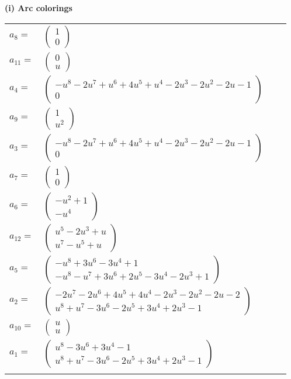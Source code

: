 \documentclass[1p]{elsarticle_modified}
\theoremstyle{definition}
\begin{document}
\flushleft \textbf{(i) Arc colorings}\\
\begin{tabular}{m{7pt} m{180pt} m{7pt} m{180pt} }
\flushright $a_{8}=$&$\begin{pmatrix}1\\0\end{pmatrix}$ \\
\flushright $a_{11}=$&$\begin{pmatrix}0\\u\end{pmatrix}$ \\
\flushright $a_{4}=$&$\begin{pmatrix}- u^8-2 u^7+u^6+4 u^5+u^4-2 u^3-2 u^2-2 u-1\\0\end{pmatrix}$ \\
\flushright $a_{9}=$&$\begin{pmatrix}1\\u^2\end{pmatrix}$ \\
\flushright $a_{3}=$&$\begin{pmatrix}- u^8-2 u^7+u^6+4 u^5+u^4-2 u^3-2 u^2-2 u-1\\0\end{pmatrix}$ \\
\flushright $a_{7}=$&$\begin{pmatrix}1\\0\end{pmatrix}$ \\
\flushright $a_{6}=$&$\begin{pmatrix}- u^2+1\\- u^4\end{pmatrix}$ \\
\flushright $a_{12}=$&$\begin{pmatrix}u^5-2 u^3+u\\u^7- u^5+u\end{pmatrix}$ \\
\flushright $a_{5}=$&$\begin{pmatrix}- u^8+3 u^6-3 u^4+1\\- u^8- u^7+3 u^6+2 u^5-3 u^4-2 u^3+1\end{pmatrix}$ \\
\flushright $a_{2}=$&$\begin{pmatrix}-2 u^7-2 u^6+4 u^5+4 u^4-2 u^3-2 u^2-2 u-2\\u^8+u^7-3 u^6-2 u^5+3 u^4+2 u^3-1\end{pmatrix}$ \\
\flushright $a_{10}=$&$\begin{pmatrix}u\\u\end{pmatrix}$ \\
\flushright $a_{1}=$&$\begin{pmatrix}u^8-3 u^6+3 u^4-1\\u^8+u^7-3 u^6-2 u^5+3 u^4+2 u^3-1\end{pmatrix}$\\&\end{tabular}
\end{document}
